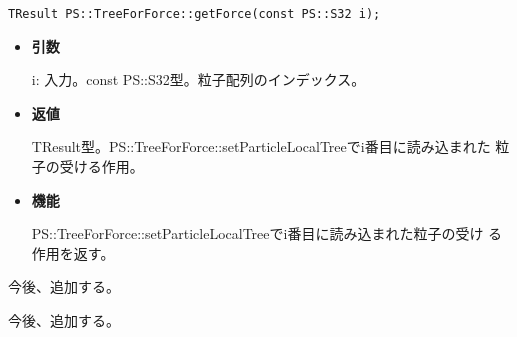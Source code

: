 
\begin{screen}
\begin{verbatim}
TResult PS::TreeForForce::getForce(const PS::S32 i);
\end{verbatim}
\end{screen}

\begin{itemize}

\item {\bf 引数}

i: 入力。const PS::S32型。粒子配列のインデックス。

\item {\bf 返値}

TResult型。PS::TreeForForce::setParticleLocalTreeでi番目に読み込まれた
粒子の受ける作用。

\item {\bf 機能}

PS::TreeForForce::setParticleLocalTreeでi番目に読み込まれた粒子の受け
る作用を返す。

\end{itemize}


今後、追加する。


今後、追加する。

\label{sec:treeForForceHighLevelAPI}

